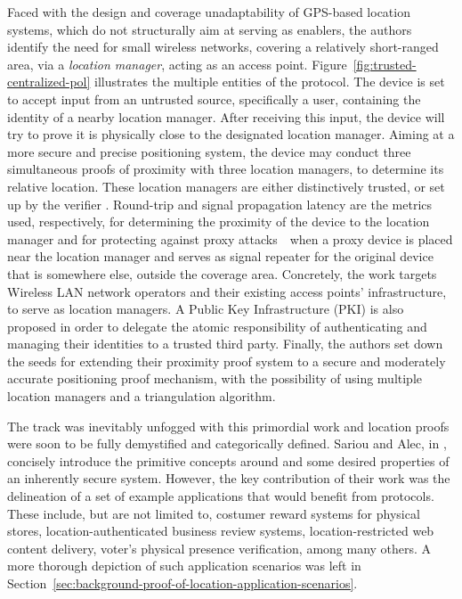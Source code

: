 Faced with the design and coverage unadaptability of GPS-based location systems, which do not structurally aim at serving as \pol{} enablers, the authors identify the need for small wireless networks, covering a relatively short-ranged area, via a \emph{location manager}, acting as an access point. Figure~\ref{fig:trusted-centralized-pol} illustrates the multiple entities of the protocol. The device is set to accept input from an untrusted source, specifically a user, containing the identity of a nearby location manager. After receiving this input, the device will try to prove it is physically close to the designated location manager. Aiming at a more secure and precise positioning system, the device may conduct three simultaneous proofs of proximity with three location managers, to determine its relative location. These location managers are either distinctively trusted, or set up by the verifier \cite{waters2003secure}. Round-trip and signal propagation latency are the metrics used, respectively, for determining the proximity of the device to the location manager and for protecting against proxy attacks~\textemdash~when a proxy device is placed near the location manager and serves as signal repeater for the original device that is somewhere else, outside the coverage area. Concretely, the work targets Wireless LAN network operators and their existing access points' infrastructure, to serve as location managers. A Public Key Infrastructure (PKI) is also proposed in order to delegate the atomic responsibility of authenticating and managing their identities to a trusted third party. Finally, the authors set down the seeds for extending their proximity proof system to a secure and moderately accurate positioning proof mechanism, with the possibility of using multiple location managers and a triangulation algorithm.

The \pol{} track was inevitably unfogged with this primordial work and location proofs were soon to be fully demystified and categorically defined. Sariou and Alec, in \cite{saroiu2009enabling}, concisely introduce the primitive concepts around \pol{} and some desired properties of an inherently secure system. However, the key contribution of their work was the delineation of a set of example applications that would benefit from \pol{} protocols. These include, but are not limited to, costumer reward systems for physical stores, location-authenticated business review systems, location-restricted web content delivery, voter's physical presence verification, among many others. A more thorough depiction of such application scenarios was left in Section~\ref{sec:background-proof-of-location-application-scenarios}.

